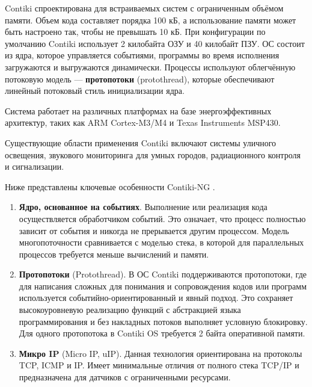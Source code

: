 Contiki спроектирована для встраиваемых систем с ограниченным объёмом памяти. Объем кода составляет порядка 100 кБ, а использование памяти может быть настроено так, чтобы не превышать 10 кБ. При конфигурации по умолчанию Contiki использует 2 килобайта ОЗУ и 40 килобайт ПЗУ. ОС состоит из ядра, которое управляется событиями, программы во время исполнения загружаются и выгружаются динамически. Процессы используют облегчённую потоковую модель --- \textbf{протопотоки} (protothread), которые обеспечивают линейный потоковый стиль инициализации ядра.

Система работает на различных платформах на базе энергоэффективных архитектур, таких как ARM Cortex-M3/M4 и Texas Instruments MSP430. 

Существующие области применения Contiki включают системы уличного освещения, звукового мониторинга для умных городов, радиационного контроля и сигнализации.

Ниже представлены ключевые особенности Contiki-NG \cite{Contiki_overview}.

\begin{enumerate}[label*=\arabic*.]
	\item \textbf{Ядро, основанное на событиях}. \newline
	Выполнение или реализация кода осуществляется обработчиком событий. Это означает, что процесс полностью зависит от события и никогда не прерывается другим процессом. Модель многопоточности сравнивается с моделью стека, в которой для параллельных процессов требуется меньше вычислений и памяти.
	
	\item \textbf{Протопотоки} (Protothread). \newline
	В ОС Contiki поддерживаются протопотоки, где для написания сложных для понимания и сопровождения кодов или программ используется событийно-ориентированный и явный подход. Это сохраняет высокоуровневую реализацию функций с абстракцией языка программирования и без накладных потоков выполняет условную блокировку. Для одного протопотока в Contiki OS требуется 2 байта оперативной памяти.
	
	\item \textbf{Микро IP}  (Micro IP, uIP). \newline
	Данная технология ориентирована на протоколы TCP, ICMP и IP. Имеет минимальные отличия от полного стека TCP/IP и предназначена для датчиков с ограниченными ресурсами.
	
\end{enumerate}



